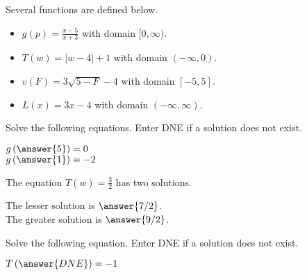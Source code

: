 \documentclass{ximera}
\begin{document}
\begin{definition}
Several functions are defined below.
\begin{itemize}
\item $g(p) = \frac{x-5}{x+3}$ with domain $[0, \infty)$. \\ \quad
\item $T(w) = | w - 4 | + 1$ with domain $(-\infty, 0)$. 
\item $v(F) = 3\sqrt{5 - F} - 4$ with domain $[-5, 5]$. 
\item $L(x) = 3x - 4$ with domain $(-\infty, \infty)$. 
\end{itemize}
\end{definition}



\begin{exercise}
Solve the following equations.  Enter DNE if a solution does not exist.

$g\left( \answer{5} \right) = 0$   \\
$g\left( \answer{1} \right) = -2$  

\end{exercise}




\begin{exercise}
The equation $T(w) = \frac{3}{2}$ has two solutions.  

The lesser solution is $\answer{7/2} $.  \\
The greater solution is $\answer{9/2} $.

\end{exercise}



\begin{exercise}
Solve the following equation.  Enter DNE if a solution does not exist.

$T\left( \answer{DNE} \right) = -1$   


\end{exercise}
\end{document}
